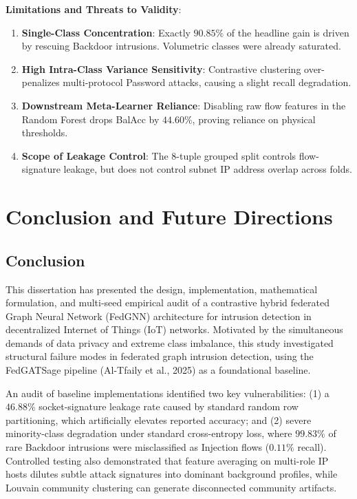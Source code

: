 \documentclass[12pt,a4paper]{report}
\begin{document}
\textbf{Limitations and Threats to Validity}:
\begin{enumerate}
    \item \textbf{Single-Class Concentration}: Exactly $90.85\%$ of the headline gain is driven by rescuing Backdoor intrusions. Volumetric classes were already saturated.
    \item \textbf{High Intra-Class Variance Sensitivity}: Contrastive clustering over-penalizes multi-protocol Password attacks, causing a slight recall degradation.
    \item \textbf{Downstream Meta-Learner Reliance}: Disabling raw flow features in the Random Forest drops BalAcc by $44.60\%$, proving reliance on physical thresholds.
    \item \textbf{Scope of Leakage Control}: The 8-tuple grouped split controls flow-signature leakage, but does not control subnet IP address overlap across folds.
\end{enumerate}


\chapter{Conclusion and Future Directions}\label{ch:conclusion}
\label{chap:conclusion}

\section{Conclusion}\label{sec:conclusion_summary}

This dissertation has presented the design, implementation, mathematical formulation, and multi-seed empirical audit of a contrastive hybrid federated Graph Neural Network (FedGNN) architecture for intrusion detection in decentralized Internet of Things (IoT) networks. Motivated by the simultaneous demands of data privacy and extreme class imbalance, this study investigated structural failure modes in federated graph intrusion detection, using the FedGATSage pipeline (Al-Tfaily et al., 2025) as a foundational baseline.

An audit of baseline implementations identified two key vulnerabilities: (1) a $46.88\%$ socket-signature leakage rate caused by standard random row partitioning, which artificially elevates reported accuracy; and (2) severe minority-class degradation under standard cross-entropy loss, where $99.83\%$ of rare Backdoor intrusions were misclassified as Injection flows ($0.11\%$ recall). Controlled testing also demonstrated that feature averaging on multi-role IP hosts dilutes subtle attack signatures into dominant background profiles, while Louvain community clustering can generate disconnected community artifacts.
\end{document}
